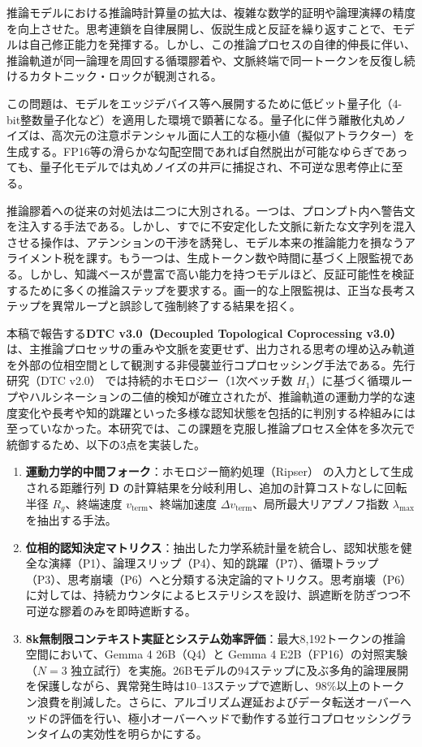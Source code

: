 \documentclass[11pt,a4paper]{article}
\begin{document}
推論モデルにおける推論時計算量の拡大は、複雑な数学的証明や論理演繹の精度を向上させた。思考連鎖を自律展開し、仮説生成と反証を繰り返すことで、モデルは自己修正能力を発揮する。しかし、この推論プロセスの自律的伸長に伴い、推論軌道が同一論理を周回する循環膠着や、文脈終端で同一トークンを反復し続けるカタトニック・ロックが観測される。

この問題は、モデルをエッジデバイス等へ展開するために低ビット量子化（4-bit整数量子化など）を適用した環境で顕著になる。量子化に伴う離散化丸めノイズは、高次元の注意ポテンシャル面に人工的な極小値（擬似アトラクター）を生成する。FP16等の滑らかな勾配空間であれば自然脱出が可能なゆらぎであっても、量子化モデルでは丸めノイズの井戸に捕捉され、不可逆な思考停止に至る。

推論膠着への従来の対処法は二つに大別される。一つは、プロンプト内へ警告文を注入する手法である。しかし、すでに不安定化した文脈に新たな文字列を混入させる操作は、アテンションの干渉を誘発し、モデル本来の推論能力を損なうアライメント税を課す。もう一つは、生成トークン数や時間に基づく上限監視である。しかし、知識ベースが豊富で高い能力を持つモデルほど、反証可能性を検証するために多くの推論ステップを要求する。画一的な上限監視は、正当な長考ステップを異常ループと誤診して強制終了する結果を招く。

本稿で報告する\textbf{DTC v3.0（Decoupled Topological Coprocessing v3.0）}は、主推論プロセッサの重みや文脈を変更せず、出力される思考の埋め込み軌道を外部の位相空間として観測する非侵襲並行コプロセッシング手法である。先行研究（DTC v2.0）\cite{matsumoto2026dtc} では持続的ホモロジー（1次ベッチ数 $H_1$）に基づく循環ループやハルシネーションの二値的検知が確立されたが、推論軌道の運動力学的な速度変化や長考や知的跳躍といった多様な認知状態を包括的に判別する枠組みには至っていなかった。本研究では、この課題を克服し推論プロセス全体を多次元で統御するため、以下の3点を実装した。

\begin{enumerate}
    \item \textbf{運動力学的中間フォーク}：ホモロジー簡約処理（Ripser）\cite{bauer2021ripser} の入力として生成される距離行列 $\mathbf{D}$ の計算結果を分岐利用し、追加の計算コストなしに回転半径 $R_g$、終端速度 $v_{\mathrm{term}}$、終端加速度 $\Delta v_{\mathrm{term}}$、局所最大リアプノフ指数 $\lambda_{\max}$ を抽出する手法。
    \item \textbf{位相的認知決定マトリクス}：抽出した力学系統計量を統合し、認知状態を健全な演繹（P1）、論理スリップ（P4）、知的跳躍（P7）、循環トラップ（P3）、思考崩壊（P6）へと分類する決定論的マトリクス。思考崩壊（P6）に対しては、持続カウンタによるヒステリシスを設け、誤遮断を防ぎつつ不可逆な膠着のみを即時遮断する。
    \item \textbf{8k無制限コンテキスト実証とシステム効率評価}：最大8,192トークンの推論空間において、Gemma 4 26B（Q4）と Gemma 4 E2B（FP16）の対照実験（$N=3$ 独立試行）を実施。26Bモデルの94ステップに及ぶ多角的論理展開を保護しながら、異常発生時は10--13ステップで遮断し、98\%以上のトークン浪費を削減した。さらに、アルゴリズム遅延およびデータ転送オーバーヘッドの評価を行い、極小オーバーヘッドで動作する並行コプロセッシングランタイムの実効性を明らかにする。
\end{enumerate}
\end{document}
